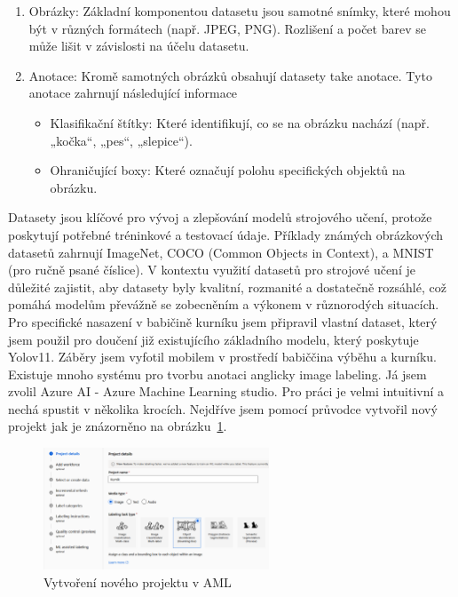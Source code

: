 \begin{enumerate}
    \item Obrázky: Základní komponentou datasetu jsou samotné snímky, které mohou být v různých formátech (např. JPEG, PNG). Rozlišení a počet barev se může lišit v závislosti na účelu datasetu.
    \item Anotace: Kromě samotných obrázků obsahují datasety take anotace. Tyto anotace zahrnují následující informace
    \begin{itemize}
        \item Klasifikační štítky: Které identifikují, co se na obrázku nachází (např. „kočka“, „pes“, „slepice“).
        \item Ohraničující boxy: Které označují polohu specifických objektů na obrázku.
    \end{itemize}
\end{enumerate}

Datasety jsou klíčové pro vývoj a zlepšování modelů strojového učení, protože poskytují potřebné tréninkové a testovací údaje.
Příklady známých obrázkových datasetů zahrnují ImageNet, COCO (Common Objects in Context), a MNIST (pro ručně psané číslice).
V kontextu využití datasetů pro strojové učení je důležité zajistit, aby datasety byly kvalitní, rozmanité a dostatečně rozsáhlé, což pomáhá modelům převážně se zobecněním a výkonem v různorodých situacích.
Pro specifické nasazení v babičině kurníku jsem připravil vlastní dataset, který jsem použil pro doučení již existujícího základního modelu, který poskytuje Yolov11.
Záběry jsem vyfotil mobilem v prostředí babiččina výběhu a kurníku.
Existuje mnoho systému pro tvorbu anotaci anglicky image labeling.
Já jsem zvolil Azure AI - Azure Machine Learning studio.
Pro práci je velmi intuitivní a nechá spustit v několika krocích.
Nejdříve jsem pomocí průvodce vytvořil nový projekt jak je znázorněno na obrázku~\ref{fig:create_learning_project}.

\begin{figure}[htbp]
    \centering
    \includegraphics[width=0.6\textwidth]{img/create_learning_project}
    \caption{Vytvoření nového projektu v AML}
    \label{fig:create_learning_project}
\end{figure}


